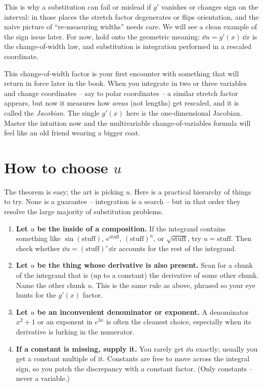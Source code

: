 This is why a substitution can fail or mislead if $g'$ vanishes or changes sign on
the interval: in those places the stretch factor degenerates or flips orientation,
and the naive picture of ``re-measuring widths'' needs care. We will see a clean
example of the sign issue later. For now, hold onto the geometric meaning: $\dd u =
g'(x)\,\dd x$ is the change-of-width law, and substitution is integration performed
in a rescaled coordinate.

\begin{connectionbox}
This change-of-width factor is your first encounter with something that will return
in force later in the book. When you integrate in two or three variables and change
coordinates -- say to polar coordinates -- a similar stretch factor appears, but now
it measures how \emph{areas} (not lengths) get rescaled, and it is called the
\emph{Jacobian}. The single $g'(x)$ here is the one-dimensional Jacobian. Master the
intuition now and the multivariable change-of-variables formula will feel like an
old friend wearing a bigger coat.
\end{connectionbox}

\section{How to choose $u$}
\label{ch22:choosing-u}

The theorem is easy; the art is picking $u$. Here is a practical hierarchy of
things to try. None is a guarantee -- integration is a search -- but in that order
they resolve the large majority of substitution problems.

\begin{enumerate}
\item \textbf{Let $u$ be the inside of a composition.} If the integrand contains
something like $\sin(\text{stuff})$, $e^{\text{stuff}}$, $(\text{stuff})^{n}$, or
$\sqrt{\text{stuff}}$, try $u = \text{stuff}$. Then check whether $\dd u =
(\text{stuff})'\,\dd x$ accounts for the rest of the integrand.

\item \textbf{Let $u$ be the thing whose derivative is also present.} Scan for a
chunk of the integrand that is (up to a constant) the derivative of some other
chunk. Name the other chunk $u$. This is the same rule as above, phrased so your eye
hunts for the $g'(x)$ factor.

\item \textbf{Let $u$ be an inconvenient denominator or exponent.} A denominator
$x^2+1$ or an exponent in $e^{3x}$ is often the cleanest choice, especially when its
derivative is lurking in the numerator.

\item \textbf{If a constant is missing, supply it.} You rarely get $\dd u$ exactly;
usually you get a constant multiple of it. Constants are free to move across the
integral sign, so you patch the discrepancy with a constant factor. (Only constants
-- never a variable.)
\end{enumerate}


